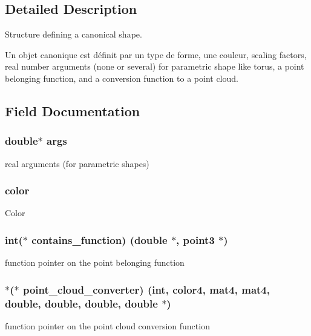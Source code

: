 \subsection{Detailed Description}
Structure defining a canonical shape. 

Un objet canonique est définit par un type de forme, une couleur, scaling factors, real number arguments (none or several) for parametric shape like torus, a point belonging function, and a conversion function to a point cloud. 

\subsection{Field Documentation}
\subsubsection[{\texorpdfstring{args}{args}}]{\setlength{\rightskip}{0pt plus 5cm}double$\ast$ args}\hypertarget{struct_shape_a543b882e1acc4b5299df7a74685922db}{}\label{struct_shape_a543b882e1acc4b5299df7a74685922db}
real arguments (for parametric shapes) 
\subsubsection[{\texorpdfstring{color}{color}}]{ color}\hypertarget{struct_shape_a9c2cebcefe8a6bf5fe495236373a6b66}{}\label{struct_shape_a9c2cebcefe8a6bf5fe495236373a6b66}
Color 
\subsubsection[{\texorpdfstring{contains\+\_\+function}{contains_function}}]{\setlength{\rightskip}{0pt plus 5cm}int($\ast$ contains\+\_\+function) (double $\ast$, {\bf point3} $\ast$)}\hypertarget{struct_shape_afbf4b798f73deb289c638d2204faa656}{}\label{struct_shape_afbf4b798f73deb289c638d2204faa656}
function pointer on the point belonging function 
\subsubsection[{\texorpdfstring{point\+\_\+cloud\+\_\+converter}{point_cloud_converter}}]{$\ast$($\ast$ point\+\_\+cloud\+\_\+converter) (int, {\bf color4}, {\bf mat4}, {\bf mat4}, double, double, double, double $\ast$)}\hypertarget{struct_shape_a41118ddb51e72b975315e29488324787}{}\label{struct_shape_a41118ddb51e72b975315e29488324787}
function pointer on the point cloud conversion function 
